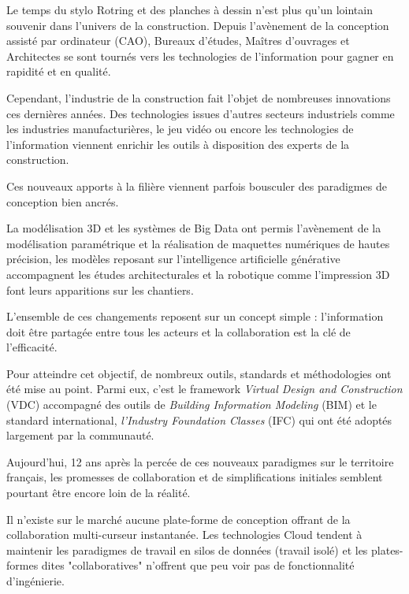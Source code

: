 
Le temps du stylo Rotring et des planches à dessin n'est plus qu'un lointain souvenir dans l'univers de la construction. Depuis l'avènement de la conception assisté par ordinateur (CAO), Bureaux d'études, Maîtres d'ouvrages et Architectes se sont tournés vers les technologies de l'information pour gagner en rapidité et en qualité.

Cependant, l'industrie de la construction fait l'objet de nombreuses innovations ces dernières années. Des technologies issues d'autres secteurs industriels comme les industries manufacturières, le jeu vidéo ou encore les technologies de l'information viennent enrichir les outils à disposition des experts de la construction. 

Ces nouveaux apports à la filière viennent parfois bousculer des paradigmes de conception bien ancrés.

La modélisation 3D et les systèmes de Big Data ont permis l'avènement de la modélisation paramétrique et la réalisation de maquettes numériques de hautes précision, les modèles reposant sur l'intelligence artificielle générative accompagnent les études architecturales et la robotique comme l'impression 3D font leurs apparitions sur les chantiers.

L'ensemble de ces changements reposent sur un concept simple : l'information doit être partagée entre tous les acteurs et la collaboration est la clé de l'efficacité.

Pour atteindre cet objectif, de nombreux outils, standards et méthodologies ont été mise au point. Parmi eux, c'est le framework \textit{Virtual Design and Construction}\cite{brittanygielReturnInvestmentAnalysis2013} (VDC) accompagné des outils de \textit{Building Information Modeling}\cite{burcinbecerik-gerberPERCEIVEDVALUEBUILDING2010} (BIM) et le standard international, \textit{l'Industry Foundation Classes}\cite{yacinerezguiGOVERNANCEAPPROACHBIM2013} (IFC) qui ont été adoptés largement par la communauté.


Aujourd'hui, 12 ans après la percée de ces nouveaux paradigmes sur le territoire français, les promesses de collaboration et de simplifications initiales semblent pourtant être encore loin de la réalité.

Il n'existe sur le marché aucune plate-forme de conception offrant de la collaboration multi-curseur instantanée. Les technologies Cloud tendent à maintenir les paradigmes de travail en silos de données (travail isolé) et les plates-formes dites "collaboratives" n'offrent que peu voir pas de fonctionnalité d'ingénierie. 

